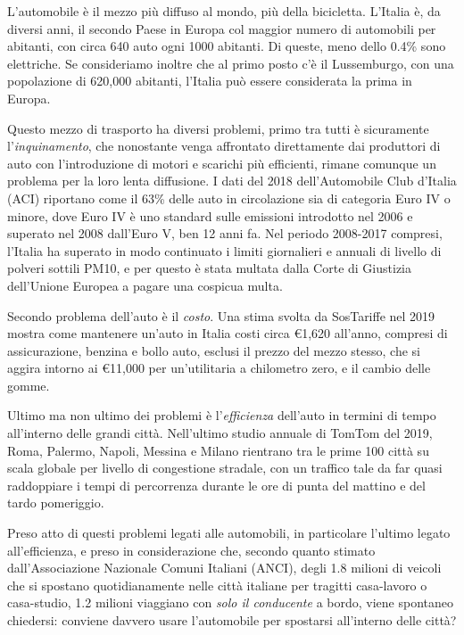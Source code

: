 L'automobile è il mezzo più diffuso al mondo, più della bicicletta. L'Italia è, da diversi anni, il secondo Paese in Europa col maggior numero di automobili per abitanti, con circa 640 auto ogni 1000 abitanti\cite{eurostatcars}. Di queste, meno dello 0.4\% sono elettriche\cite{anfiastudiestatistiche}. Se consideriamo inoltre che al primo posto c'è il Lussemburgo, con una popolazione di 620,000 abitanti, l'Italia può essere considerata la prima in Europa.

Questo mezzo di trasporto ha diversi problemi, primo tra tutti è sicuramente l'\emph{inquinamento}, che nonostante venga affrontato direttamente dai produttori di auto con l'introduzione di motori e scarichi più efficienti, rimane comunque un problema per la loro lenta diffusione. I dati del 2018 dell'Automobile Club d'Italia (ACI) riportano come il 63\% delle auto in circolazione sia di categoria Euro IV o minore\cite{anfiastudiestatistiche}, dove Euro IV è uno standard sulle emissioni introdotto nel 2006 e superato nel 2008 dall'Euro V, ben 12 anni fa\cite{euroivstandard}. Nel periodo 2008-2017 compresi, l'Italia ha superato in modo continuato i limiti giornalieri e annuali di livello di polveri sottili PM10, e per questo è stata multata dalla Corte di Giustizia dell'Unione Europea a pagare una cospicua multa\cite{eunewssanzioneitalia}.

Secondo problema dell'auto è il \emph{costo}. Una stima svolta da SosTariffe nel 2019 mostra come mantenere un'auto in Italia costi circa €1,620 all'anno, compresi di assicurazione, benzina e bollo auto, esclusi il prezzo del mezzo stesso, che si aggira intorno ai €11,000 per un'utilitaria a chilometro zero, e il cambio delle gomme\cite{sostariffe}.

Ultimo ma non ultimo dei problemi è l'\emph{efficienza} dell'auto in termini di tempo all'interno delle grandi città. Nell'ultimo studio annuale di TomTom del 2019\cite{tomtomindexmilan}, Roma, Palermo, Napoli, Messina e Milano rientrano tra le prime 100 città su scala globale per livello di congestione stradale, con un traffico tale da far quasi raddoppiare i tempi di percorrenza durante le ore di punta del mattino e del tardo pomeriggio.

Preso atto di questi problemi legati alle automobili, in particolare l'ultimo legato all'efficienza, e preso in considerazione che, secondo quanto stimato dall'Associazione Nazionale Comuni Italiani (ANCI), degli 1.8 milioni di veicoli che si spostano quotidianamente nelle città italiane per tragitti casa-lavoro o casa-studio, 1.2 milioni viaggiano con \emph{solo il conducente} a bordo\cite{anciperrepubblica}, viene spontaneo chiedersi: conviene davvero usare l'automobile per spostarsi all'interno delle città?